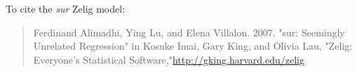To cite the \emph{ sur } Zelig model:
 \begin{verse}
 Ferdinand Alimadhi, Ying Lu, and Elena Villalon. 2007. "sur: Seemingly Unrelated Regression" in Kosuke Imai, Gary King, and Olivia Lau, "Zelig: Everyone's Statistical Software,"\url{http://gking.harvard.edu/zelig} 
\end{verse}